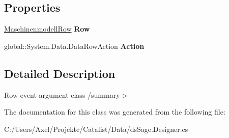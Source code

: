\subsection*{Properties}
\begin{DoxyCompactItemize}
\item 
\hyperlink{class_products_1_1_data_1_1ds_sage_1_1_maschinenmodell_row}{Maschinenmodell\+Row} {\bfseries Row}\hypertarget{class_products_1_1_data_1_1ds_sage_1_1_maschinenmodell_row_change_event_ac0763db060a64484e3da8bf5cb04eff0}{}\label{class_products_1_1_data_1_1ds_sage_1_1_maschinenmodell_row_change_event_ac0763db060a64484e3da8bf5cb04eff0}

\item 
global\+::\+System.\+Data.\+Data\+Row\+Action {\bfseries Action}\hypertarget{class_products_1_1_data_1_1ds_sage_1_1_maschinenmodell_row_change_event_a378057cd09089dc28ee4aa55824b6f1a}{}\label{class_products_1_1_data_1_1ds_sage_1_1_maschinenmodell_row_change_event_a378057cd09089dc28ee4aa55824b6f1a}

\end{DoxyCompactItemize}


\subsection{Detailed Description}
Row event argument class /summary$>$ 

The documentation for this class was generated from the following file\+:\begin{DoxyCompactItemize}
\item 
C\+:/\+Users/\+Axel/\+Projekte/\+Catalist/\+Data/ds\+Sage.\+Designer.\+cs\end{DoxyCompactItemize}
